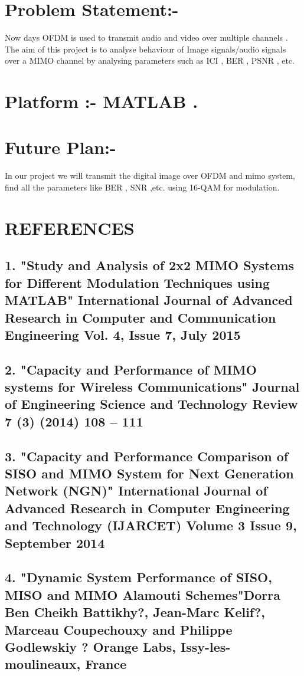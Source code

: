 \documentclass[12pt]{report}
\begin{document}
\section*{Problem Statement:-}
Now days OFDM is used to transmit audio and video over multiple channels . The aim of this project is to analyse behaviour of Image signals/audio signals over a MIMO channel by analysing parameters such as ICI , BER , PSNR , etc.

\section*{Platform :- MATLAB .} 

\section*{Future Plan:-}
In our project  we will transmit the digital image over OFDM and mimo system, find all the parameters like BER , SNR ,etc. using 16-QAM for modulation.


\section*{REFERENCES}
\subsection*{1. "Study and Analysis of 2x2 MIMO Systems for
Different Modulation Techniques using
MATLAB" International Journal of Advanced Research in Computer and Communication Engineering
Vol. 4, Issue 7, July 2015}
\subsection*{2. "Capacity and Performance of MIMO systems for Wireless Communications" Journal of Engineering Science and Technology Review 7 (3) (2014) 108 – 111}
\subsection*{3. "Capacity and Performance Comparison of SISO and MIMO System for Next Generation Network (NGN)" International Journal of Advanced Research in Computer Engineering and Technology (IJARCET)
Volume 3 Issue 9, September 2014}
\subsection*{4. "Dynamic System Performance of SISO, MISO and
MIMO Alamouti Schemes"Dorra Ben Cheikh Battikhy?, Jean-Marc Kelif?, Marceau Coupechouxy and Philippe Godlewskiy
? Orange Labs, Issy-les-moulineaux, France }
\end{document}
